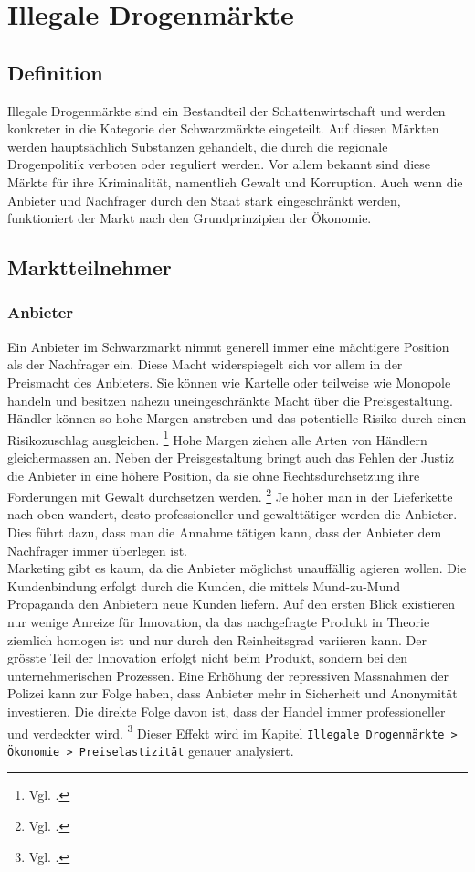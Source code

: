 \documentclass[../main.tex]{subfiles}
\begin{document}
 	\section{Illegale Drogenmärkte}
 	
 	\subsection{Definition}
 	
 	Illegale Drogenmärkte sind ein Bestandteil der Schattenwirtschaft und werden konkreter in die Kategorie der Schwarzmärkte eingeteilt.
 	Auf diesen Märkten werden hauptsächlich Substanzen gehandelt, die durch die regionale Drogenpolitik verboten oder reguliert werden.
 	Vor allem bekannt sind diese Märkte für ihre Kriminalität, namentlich Gewalt und Korruption.
 	Auch wenn die Anbieter und Nachfrager durch den Staat stark eingeschränkt werden, funktioniert der Markt nach den Grundprinzipien der Ökonomie.
 		
	
	\subsection{Marktteilnehmer}	
	
	\subsubsection{Anbieter}	
	Ein Anbieter im Schwarzmarkt nimmt generell immer eine mächtigere Position als der Nachfrager ein.
	Diese Macht widerspiegelt sich vor allem in der Preismacht des Anbieters.
	Sie können wie Kartelle oder teilweise wie Monopole handeln und besitzen nahezu uneingeschränkte Macht über die Preisgestaltung.
	Händler können so hohe Margen anstreben und das potentielle Risiko durch einen Risikozuschlag ausgleichen.%
	\footnote{Vgl. \cite{becker-2006}.}
	Hohe Margen ziehen alle Arten von Händlern gleichermassen an.
	Neben der Preisgestaltung bringt auch das Fehlen der Justiz die Anbieter in eine höhere Position, da sie ohne Rechtsdurchsetzung ihre Forderungen mit Gewalt durchsetzen werden.%
	\footnote{Vgl. \cite{departmentofjustice-1994}.}
	Je höher man in der Lieferkette nach oben wandert, desto professioneller und gewalttätiger werden die Anbieter. 
	Dies führt dazu, dass man die Annahme tätigen kann, dass der Anbieter dem Nachfrager immer überlegen ist.\\
	
	\noindent
	Marketing gibt es kaum, da die Anbieter möglichst unauffällig agieren wollen.
	Die Kundenbindung erfolgt durch die Kunden, die mittels Mund-zu-Mund Propaganda den Anbietern neue Kunden liefern.
	Auf den ersten Blick existieren nur wenige Anreize für Innovation, da das nachgefragte Produkt in Theorie ziemlich homogen ist und nur durch den Reinheitsgrad variieren kann.		
	Der grösste Teil der Innovation erfolgt nicht beim Produkt, sondern bei den unternehmerischen Prozessen. 
	Eine Erhöhung der repressiven Massnahmen der Polizei kann zur Folge haben, dass Anbieter mehr in Sicherheit und Anonymität investieren.
	Die direkte Folge davon ist, dass der Handel immer professioneller und verdeckter wird.%
\footnote{Vgl. \cite{haucap-2018}.}
	Dieser Effekt wird im Kapitel \texttt{Illegale Drogenmärkte > Ökonomie > Preiselastizität} genauer analysiert.
	
\end{document}
